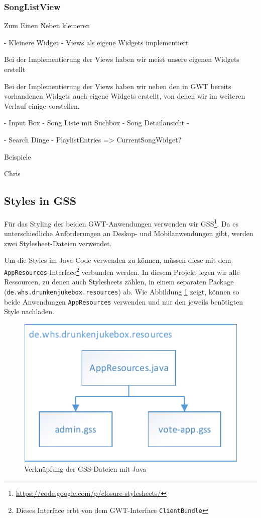 \subsubsection{SongListView}

 Zum Einen Neben kleineren 


- Kleinere Widget 
- Views als eigene Widgets implementiert

Bei der Implementierung der Views haben wir meist unsere eigenen Widgets erstellt


Bei der Implementierung der Views haben wir neben den in GWT bereits vorhandenen Widgets auch eigene Widgets erstellt, von denen wir im weiteren Verlauf einige vorstellen.

- Input Box
- Song Liste mit Suchbox
- Song Detailansicht
- 

- Search Dinge
- PlaylistEntries => CurrentSongWidget?

Beispiele

Chris

\subsection{Styles in GSS}
Für das Styling der beiden GWT-Anwendungen verwenden wir GSS\footnote{\url{https://code.google.com/p/closure-stylesheets/}}. Da es unterschiedliche Anforderungen
an Deskop- und Mobilanwendungen gibt, werden zwei Stylesheet-Dateien verwendet.

Um die Styles im Java-Code verwenden zu können, müssen diese mit dem \texttt{AppResources}-Interface\footnote{Dieses Interface erbt von dem GWT-Interface \texttt{ClientBundle}} verbunden werden.
In diesem Projekt legen wir alle Ressourcen, zu denen auch Stylesheets zählen, in
einem separaten Package (\texttt{de.whs.drunkenjukebox.resources}) ab. Wie Abbildung
\ref{fig:GSS} zeigt, können so beide Anwendungen \texttt{AppResources} verwenden
und nur den jeweils benötigten Style nachladen.

\begin{figure}[tbh]
\centering
\includegraphics[width=0.6\linewidth]{Bilder/GSS}
\caption{Verknüpfung der GSS-Dateien mit Java}
\label{fig:GSS}
\end{figure}


